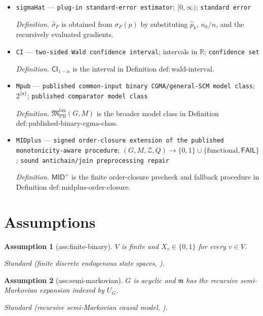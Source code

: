 \documentclass{article}
\newtheorem{assumption}{Assumption}
\begin{document}
\begin{itemize}
  \item \texttt{sigmaHat} --- \texttt{plug-\allowbreak{}in standard-\allowbreak{}error estimator}; \([0,\infty)\); \texttt{standard error}
  \par\smallskip\noindent\emph{Definition.} \(\widehat\sigma_F\) is obtained from \(\sigma_F(p)\) by substituting \(\widehat p_k\), \(n_k/n\), and the recursively evaluated gradients.
  \item \texttt{CI} --- \texttt{two-\allowbreak{}sided Wald confidence interval}; intervals in \(\mathbb R\); \texttt{confidence set}
  \par\smallskip\noindent\emph{Definition.} \(\mathsf{CI}_{1-\alpha}\) is the interval in Definition \(\mathrm{def:wald\text{-}interval}\).
  \item \texttt{Mpub} --- \texttt{published common-\allowbreak{}input binary CGMA/\allowbreak{}general-\allowbreak{}SCM model class}; \(2^{\{\mathfrak s\}}\); \texttt{published comparator model class}
  \par\smallskip\noindent\emph{Definition.} \(\mathfrak M_{\mathrm{PB}}^{\mathrm{bin}}(G,M)\) is the broader model class in Definition \(\mathrm{def:published\text{-}binary\text{-}cgma\text{-}class}\).
  \item \texttt{MIDplus} --- \texttt{signed order-\allowbreak{}closure extension of the published monotonicity-\allowbreak{}aware procedure}; \((G,M,\mathcal Z,Q)\to\{0,1\}\cup\{\text{functional},\mathsf{FAIL}\}\); \texttt{sound antichain/\allowbreak{}join preprocessing repair}
  \par\smallskip\noindent\emph{Definition.} \(\mathsf{MID}^{+}\) is the finite order-closure precheck and fallback procedure in Definition \(\mathrm{def:midplus\text{-}order\text{-}closure}\).
\end{itemize}

\section{Assumptions}

\begin{assumption}[ass:finite-binary]\label{ass:finite-binary}
\(V\) is finite and \(X_v\in\{0,1\}\) for every \(v\in V\).
\par\smallskip\noindent\emph{Standard} (finite discrete endogenous state spaces, \cite{ZhangTianBareinboim2022}).
\end{assumption}

\begin{assumption}[ass:semi-markovian]\label{ass:semi-markovian}
\(G\) is acyclic and \(\mathfrak m\) has the recursive semi-Markovian expansion indexed by \(U_G\).
\par\smallskip\noindent\emph{Standard} (recursive semi-Markovian causal model, \cite{ShpitserPearl2008}).
\end{assumption}
\end{document}
